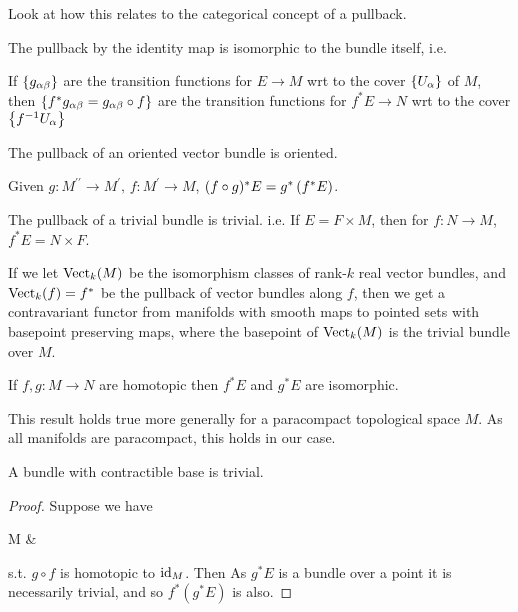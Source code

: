 \documentclass{article}
\begin{document}
\begin{ex}
	Look at how this relates to the categorical concept of a pullback. 
\end{ex}

\begin{example}
	The pullback by the identity map is isomorphic to the bundle itself, i.e. 
\end{example}

\begin{prop}
If $\left\{ g_{\alpha\beta} \right\}$ are the transition functions for $E\to M$ wrt to the cover $\left\{ U_\alpha \right\}$ of $M$, then $\left\{ f^\ast g_{\alpha\beta} = g_{\alpha\beta}\circ f \right\}$ are the transition functions for $f^\ast E \to N$ wrt to the cover $\left\{ f^{-1}U_\alpha \right\}$
\end{prop}
\begin{corollary}
The pullback of an oriented vector bundle is oriented. 	
\end{corollary}


\begin{lemma}
Given $g:M^{\prime\prime}\to M^{\prime}, \, f:M^\prime \to M$, $(f \circ g)^{\ast}E = g^{\ast}\left( f^{\ast}E \right)$.
\end{lemma}

\begin{lemma}
	The pullback of a trivial bundle is trivial. i.e. If $E =F \times M$, then for $f:N \to M$, $f^{\ast}E = N \times F$.
\end{lemma}

\begin{remark}
	If we let $\operatorname{Vect}_k(M)$ be the isomorphism classes of rank-$k$ real vector bundles, and $\operatorname{Vect}_k(f) = f^{\ast}$ be the pullback of vector bundles along $f$, then we get a contravariant functor from manifolds with smooth maps to pointed sets with basepoint preserving maps, where the basepoint of $\operatorname{Vect}_k(M)$ is the trivial bundle over $M$.
\end{remark}

\begin{prop}
	If $f,g : M \to N$ are homotopic then $f^{\ast}E$ and $g^{\ast}E$ are isomorphic.
\end{prop}
\begin{remark}
	This result holds true more generally for a  paracompact topological space $M$. As all manifolds are paracompact, this holds in our case.
\end{remark}
\begin{corollary}
	A bundle with contractible base is trivial.
\end{corollary}
\begin{proof}
	Suppose we have 
	\begin{tkz}
		M  & \ast {}
	\end{tkz}
s.t. $g \circ f$ is homotopic to $\operatorname{id}_M$. Then 
As $g^{\ast}E$ is a bundle over a point it is necessarily trivial, and so $f^{\ast}(g^{\ast}E)$ is also.
\end{proof}
\end{document}
